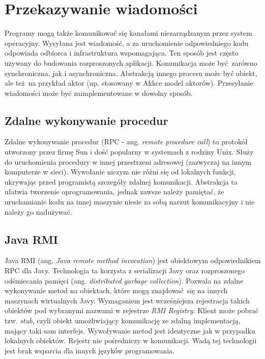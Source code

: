 \section{Przekazywanie wiadomości}

Programy mogą także komunikować się kanałami niezarządzanym przez system operacyjny. Wysyłana jest wiadomość, a za uruchomienie odpowiedniego kodu odpowiada odbiorca i infrastruktura wspomagająca. Ten sposób jest często używany do budowania rozproszonych aplikacji. Komunikacja może być zarówno synchroniczna, jak i asynchroniczna. Abstrakcją innego procesu może być obiekt, ale też na przykład aktor (np. stosowany w Akkce\cite{akka} model aktorów). Przesyłanie wiadomości może być zaimplementowane w dowolny sposób.


\subsection{Zdalne wykonywanie procedur}

Zdalne wykonywanie procedur (RPC - ang. \textit{remote procedure call}) to protokół utworzony przez firmę Sun\cite{rpc} i dość popularny w systemach z rodziny Unix. Służy do uruchomienia procedury w innej przestrzeni adresowej (zazwyczaj na innym komputerze w sieci). Wywołanie niczym nie różni się od lokalnych funkcji, ukrywając przed programistą szczegóły zdalnej komunikacji. Abstrakcja ta ułatwia tworzenie oprogramowania, jednak zawsze należy pamiętać, że uruchamianie kodu na innej maszynie niesie za sobą narzut komunikacyjny i nie należy go nadużywać.


\subsection{Java RMI}

Java RMI (ang. \textit{Java remote method invocation}) jest obiektowym odpowiednikiem RPC dla Javy. Technologia ta korzysta z serializacji Javy oraz rozproszonego odśmiecania pamięci (ang. \textit{distributed garbage collection}). Pozwala na zdalne wykonywanie metod na obiektach, które mogą znajdować się na innych maszynach wirtualnych Javy. Wymaganiem jest wcześniejsza rejestracja takich obiektów pod wybranymi nazwami w rejestrze \textit{RMI Registry}. Klient może pobrać tzw. \textit{stub}, czyli obiekt umożliwiający komunikację ze zdalną implementacją, mający taki sam interfejs. Wywoływanie metod jest identyczne jak w przypadku lokalnych obiektów. Rejestr nie pośredniczy w komunikacji. Wadą tej technologii jest brak wsparcia dla innych języków programowania.


